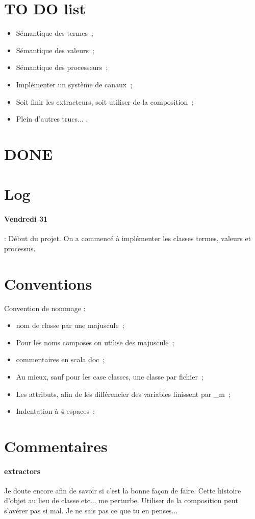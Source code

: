 \documentclass{article}
\begin{document}
\section{TO DO list}
\begin{itemize}
  \item Sémantique des termes~; 
  \item Sémantique des valeurs~;
  \item Sémantique des processeurs~;
  \item Implémenter un système de canaux~;
  \item Soit finir les extracteurs, soit utiliser de la composition~;
  \item Plein d'autres trucs... .
\end{itemize}
\section{DONE}
\section{Log}

\paragraph{ Vendredi 31 } : Début du projet. On a commencé à implémenter les classes termes, valeurs et processus.
\section{Conventions}

Convention de nommage :
\begin{itemize}
\item nom de classe par une majuscule~;
\item Pour les noms composes on utilise des majuscule~;
\item commentaires en scala doc~;
\item Au mieux, sauf pour les case classes, une classe par fichier~;
\item Les attributs, afin de les différencier des variables finissent par \_m~;
\item Indentation à 4 espaces~;
\end{itemize}
\section{Commentaires}
\paragraph{extractors}
Je doute encore afin de savoir si c'est la bonne façon de faire. Cette histoire d'objet au lieu de classe etc... me perturbe. Utiliser de la composition peut s'avérer pas si mal. Je ne sais pas ce que tu en penses...
\end{document}
